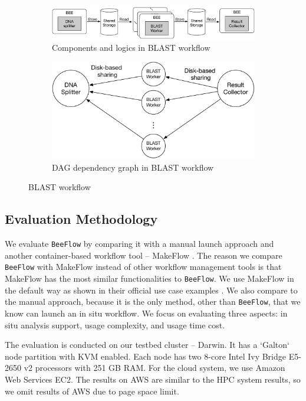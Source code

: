 \begin{figure}[h]
\centering
   \begin{subfigure}[b]{0.4\textwidth}
   \includegraphics[width=0.9\linewidth]{figures/blast.pdf}
   \caption{Components and logics in BLAST workflow}
   \label{blast-workflow} 
\end{subfigure}

\begin{subfigure}[b]{0.4\textwidth}
   \includegraphics[width=0.9\linewidth]{figures/blast-dag.pdf}
   \caption{DAG dependency graph in BLAST workflow}
   \label{blast-dag}
\end{subfigure}
\caption{BLAST workflow}
\end{figure}



\subsection{Evaluation Methodology}
We evaluate \texttt{BeeFlow} by comparing it with a manual launch approach and another container-based workflow tool -- MakeFlow \cite{albrecht2012makeflow}. The reason we compare \texttt{BeeFlow} with MakeFlow instead of other workflow management tools is that MakeFlow has the most similar functionalities to \texttt{BeeFlow}. We use MakeFlow in the default way as shown in their official use case examples \cite{makeflow-examples}. We also compare to the manual approach, because it is the only method, other than \texttt{BeeFlow}, that we know can launch an in situ workflow. We focus on evaluating three aspects: in situ analysis support, usage complexity, and usage time cost.

The evaluation is conducted on our testbed cluster -- Darwin. It has a `Galton` node partition with KVM enabled. Each node has two 8-core Intel Ivy Bridge E5-2650 v2 processors with 251 GB RAM. For the cloud system, we use Amazon Web Services EC2. The results on AWS are similar to the HPC system results, so we omit results of AWS due to page space limit.

